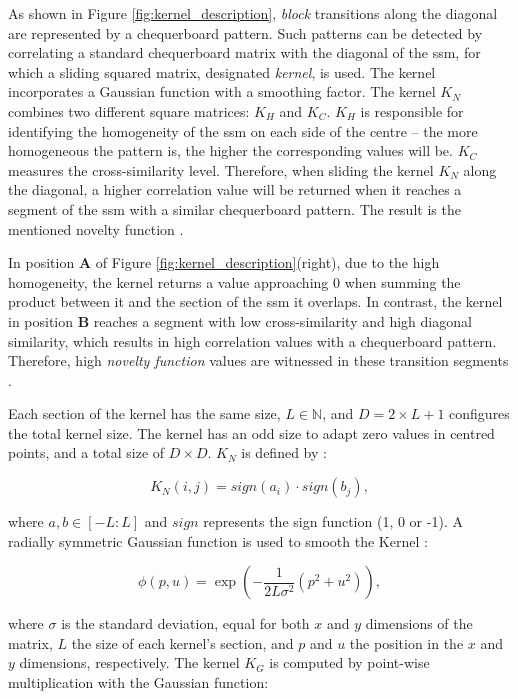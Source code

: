 As shown in Figure \ref{fig:kernel_description}, \textit{block} transitions along the diagonal are represented by a chequerboard pattern. Such patterns can be detected by correlating a standard chequerboard matrix with the diagonal of the \gls{ssm}, for which a sliding squared matrix, designated \textit{kernel}, is used. The kernel incorporates a Gaussian function with a smoothing factor. The kernel $K_N$ combines two different square matrices: $K_H$ and $K_C$. $K_H$ is responsible for identifying the homogeneity of the \gls{ssm} on each side of the centre – the more homogeneous the pattern is, the higher the corresponding values will be. $K_C$ measures the cross-similarity level. Therefore, when sliding the kernel $K_N$ along the diagonal, a higher correlation value will be returned when it reaches a segment of the \gls{ssm} with a similar chequerboard pattern. The result is the mentioned novelty function \cite{Dannenberg2008, fmp1, fmp2}.

In position \textbf{A} of Figure \ref{fig:kernel_description}(right), due to the high homogeneity, the kernel returns a value approaching 0 when summing the product between it and the section of the \gls{ssm} it overlaps. In contrast, the kernel in position \textbf{B} reaches a segment with low cross-similarity and high diagonal similarity, which results in high correlation values with a chequerboard pattern. Therefore, high \textit{novelty function} values are witnessed in these transition segments \cite{Dannenberg2008, fmp1, fmp2}.

Each section of the kernel has the same size, $L \in \mathbb{N}$, and $D = 2 \times L + 1$  configures the total kernel size. The kernel has an odd size to adapt zero values in centred points, and a total size of $D\times D$. $K_{N}$ is defined by \cite{fmp1, fmp2}:

\begin{equation}
        K_N(i,j)  = sign(a_i) \cdot sign(b_j),
\end{equation}

where $a,b\in[-L:L]$ and $sign$ represents the sign function (1, 0 or -1). A radially symmetric Gaussian function is used to smooth the Kernel \cite{fmp1, fmp2}:

\begin{equation}
    \phi(p,u) = \exp(-\frac{1}{2L\sigma^2}(p^2 + u^2)),
\end{equation}

where $\sigma$ is the standard deviation, equal for both $x$ and $y$ dimensions of the matrix, $L$ the size of each kernel's section, and $p$ and $u$ the position in the $x$ and $y$ dimensions, respectively. The kernel $K_G$ is computed by point-wise multiplication with the Gaussian function:

